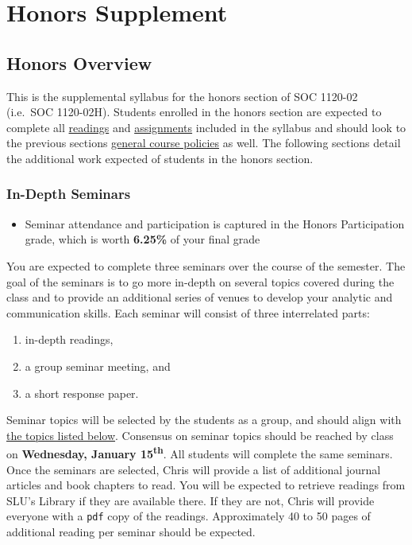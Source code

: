 \documentclass[]{book}
\providecommand{\tightlist}{%
  \setlength{\itemsep}{0pt}\setlength{\parskip}{0pt}}
\newenvironment{rmdblock}[1]
  {\begin{shaded*}
  \begin{itemize}
  \renewcommand{\labelitemi}{
    \raisebox{-.7\height}[0pt][0pt]{
      {\setkeys{Gin}{width=3em,keepaspectratio}\texttt{[image: images/\#1]}}
    }
  }
  \item
  }
  {
  \end{itemize}
  \end{shaded*}
  }
\newenvironment{rmdtip}
  {\begin{rmdblock}{tip}}
  {\end{rmdblock}}
\begin{document}
\hypertarget{part-honors-supplement}{%
\part{Honors Supplement}\label{part-honors-supplement}}

\hypertarget{honors-overview}{%
\chapter{Honors Overview}\label{honors-overview}}

This is the supplemental syllabus for the honors section of SOC 1120-02 (i.e.~SOC 1120-02H). Students enrolled in the honors section are expected to complete all \href{/lecture-schedule.html}{readings} and \href{/assignments-and-grading.html}{assignments} included in the syllabus and should look to the previous sections \href{/course-policies.html}{general course policies} as well. The following sections detail the additional work expected of students in the honors section.

\hypertarget{in-depth-seminars}{%
\section{In-Depth Seminars}\label{in-depth-seminars}}

\begin{rmdtip}
Seminar attendance and participation is captured in the Honors
Participation grade, which is worth \textbf{6.25\%} of your final grade
\end{rmdtip}

You are expected to complete three seminars over the course of the semester. The goal of the seminars is to go more in-depth on several topics covered during the class and to provide an additional series of venues to develop your analytic and communication skills. Each seminar will consist of three interrelated parts:

\begin{enumerate}
\def\labelenumi{\arabic{enumi}.}
\tightlist
\item
  in-depth readings,
\item
  a group seminar meeting, and
\item
  a short response paper.
\end{enumerate}

Seminar topics will be selected by the students as a group, and should align with \href{/honors-seminar-topics.html}{the topics listed below}. Consensus on seminar topics should be reached by class on \textbf{Wednesday, January 15\textsuperscript{th}}. All students will complete the same seminars. Once the seminars are selected, Chris will provide a list of additional journal articles and book chapters to read. You will be expected to retrieve readings from SLU's Library if they are available there. If they are not, Chris will provide everyone with a \texttt{pdf} copy of the readings. Approximately 40 to 50 pages of additional reading per seminar should be expected.
\end{document}
